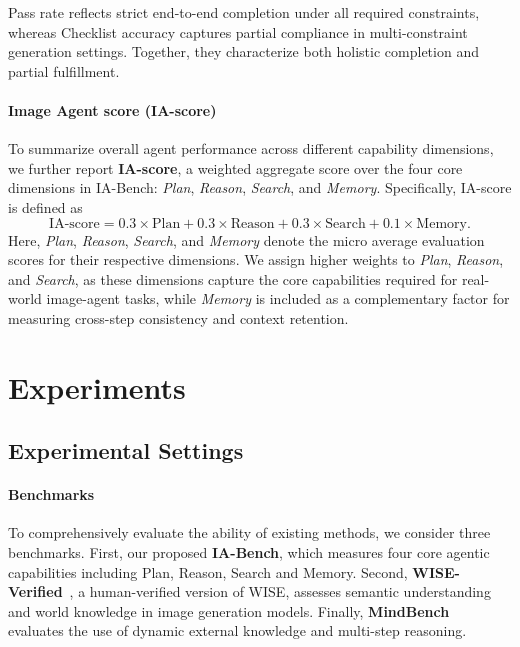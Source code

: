 \documentclass{llmxive}
\begin{document}
Pass rate reflects strict end-to-end completion under all required constraints, whereas Checklist accuracy captures partial compliance in multi-constraint generation settings. Together, they characterize both holistic completion and partial fulfillment.

\paragraph{Image Agent score (IA-score)}
To summarize overall agent performance across different capability dimensions, we further report \textbf{IA-score}, a weighted aggregate score over the four core dimensions in IA-Bench: \textit{Plan}, \textit{Reason}, \textit{Search}, and \textit{Memory}. Specifically, IA-score is defined as
\[
\mathrm{IA\text{-}score} = 0.3 \times \mathrm{Plan} + 0.3 \times \mathrm{Reason} + 0.3 \times \mathrm{Search} + 0.1 \times \mathrm{Memory}.
\]
Here, \textit{Plan}, \textit{Reason}, \textit{Search}, and \textit{Memory} denote the micro average evaluation scores for their respective dimensions. We assign higher weights to \textit{Plan}, \textit{Reason}, and \textit{Search}, as these dimensions capture the core capabilities required for real-world image-agent tasks, while \textit{Memory} is included as a complementary factor for measuring cross-step consistency and context retention.

\section{Experiments}

\subsection{Experimental Settings}

\paragraph{Benchmarks}
To comprehensively evaluate the ability of existing methods, we consider three benchmarks. First, our proposed \textbf{IA-Bench}, which measures four core agentic capabilities including Plan, Reason, Search and Memory. Second, \textbf{WISE-Verified}~\citep{Niu2025WISEAW}, a human-verified version of WISE, assesses semantic understanding and world knowledge in image generation models. Finally, \textbf{MindBench}~\citep{He2026MindBrushIA} evaluates the use of dynamic external knowledge and multi-step reasoning.
\end{document}
